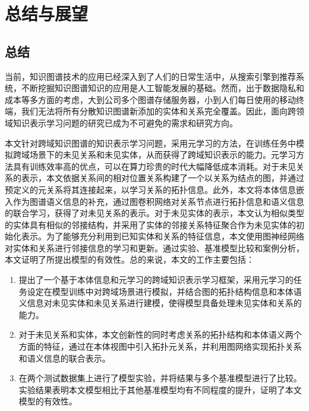 \chapter{总结与展望}

\section{总结}
当前，知识图谱技术的应用已经深入到了人们的日常生活中，从搜索引擎到推荐系统，不断挖掘知识图谱知识的应用是人工智能发展的基础。然而，出于数据隐私和成本等多方面的考虑，大到公司多个图谱存储服务器，小到人们每日使用的移动终端，我们无法将所有分散知识图谱新添加的实体和关系完全覆盖。因此，面向跨领域知识表示学习问题的研究已成为不可避免的需求和研究方向。

本文针对跨域知识图谱的知识表示学习问题，采用元学习的方法，在训练任务中模拟跨域场景下的未见关系和未见实体，从而获得了跨域知识表示的能力。元学习方法具有训练效率高的优点，可以在算力珍贵的时代大幅降低成本消耗。对于未见关系的表示，本文依据关系间的相对位置关系构建了一个以关系为结点的图，并通过预定义的元关系将其连接起来，以学习关系的拓扑信息。此外，本文将本体信息嵌入作为图谱语义信息的补充，通过图卷积网络对关系节点进行拓扑信息和语义信息的联合学习，获得了对未见关系的表示。对于未见实体的表示，本文认为相似类型的实体具有相似的邻接结构，并采用了实体的邻接关系特征聚合作为未见实体的初始化表示。为了能够充分利用到已知实体和关系的特征信息，本文使用图神经网络对实体和关系进行邻接信息的学习和更新。通过实验、基准模型比较和案例分析，本文证明了所提出模型的有效性。总的来说，本文的工作主要包括：
\begin{enumerate}[label=\arabic*)]
  \item 提出了一个基于本体信息和元学习的跨域知识表示学习框架，采用元学习的任务设定在模型训练中对跨域场景进行模拟，并结合图的拓扑结构信息和本体语义信息对未见实体和未见关系进行建模，使得模型具备处理未见实体和关系的能力。
  \item 对于未见关系和实体，本文创新性的同时考虑关系的拓扑结构和本体语义两个方面的特征，通过在本体视图中引入拓扑元关系，并利用图网络实现拓扑关系和语义信息的联合表示。
  \item 在两个测试数据集上进行了模型实验，并将结果与多个基准模型进行了比较。实验结果表明本文模型相比于其他基准模型均有不同程度的提升，证明了本文模型的有效性。
\end{enumerate}

